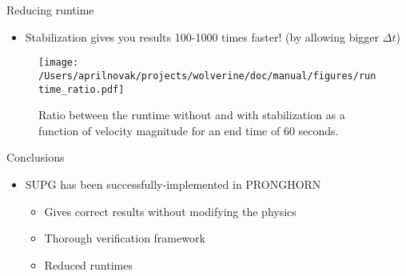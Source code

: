 \documentclass{beamer}
\begin{document}
\begin{frame}{Reducing runtime}

\begin{itemize}
\item Stabilization gives you results 100-1000 times faster! (by allowing bigger \(\Delta t\))
\end{itemize}

\begin{figure}[H]
  \centering
  \texttt{[image: /Users/aprilnovak/projects/wolverine/doc/manual/figures/runtime\_ratio.pdf]}
  \caption{Ratio between the runtime without and with stabilization as a function of velocity magnitude for an end time of 60 seconds.}
\end{figure}
\end{frame}


\begin{frame}{Conclusions}
\begin{itemize}
\item SUPG has been successfully-implemented in PRONGHORN
	\begin{itemize}
		\item Gives correct results without modifying the physics
		\item Thorough verification framework
		\item Reduced runtimes
	\end{itemize}
\end{itemize}
\end{frame}
\end{document}
